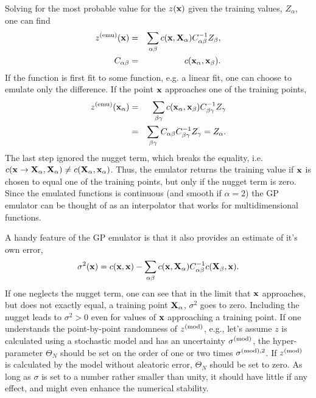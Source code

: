 Solving for the most probable value for the $z({\bf x})$ given the training values, $Z_\alpha$, one can find
\begin{eqnarray}
z^{\rm(emu)}({\bf x})&=&\sum_{\alpha\beta}c({\bf x},{\bf X}_\alpha) C^{-1}_{\alpha\beta}Z_\beta,\\
\nonumber
C_{\alpha\beta}&=&c({\bf x}_\alpha,{\bf x}_\beta).
\end{eqnarray}
If the function is first fit to some function, e.g. a linear fit, one can choose to emulate only the difference. If the point ${\bf x}$ approaches one of the training points,
\begin{eqnarray}
z^{\rm(emu)}({\bf x}_\alpha)&=&\sum_{\beta\gamma}c({\bf x}_\alpha,{\bf x}_\beta) C^{-1}_{\beta\gamma}Z_\gamma\\
\nonumber
&=&\sum_{\beta\gamma}C_{\alpha\beta}C^{-1}_{\beta\gamma}Z_\gamma=Z_\alpha.
\end{eqnarray}
The last step ignored the nugget term, which breaks the equality, i.e. $c({\bf x}\rightarrow {\bf X}_\alpha,{\bf X}_\alpha)\ne c({\bf X_{\alpha},{\bf x}_\alpha})$. Thus, the emulator returns the training value if ${\bf x}$ is chosen to equal one of the training points, but only if the nugget term is zero. Since the emulated functions is continuous (and smooth if $\alpha=2$) the GP emulator can be thought of as an interpolator that works for multidimensional functions.

A handy feature of the GP emulator is that it also provides an estimate of it's own error,
\begin{equation}
\sigma^2({\bf x}) = c({\bf x},{\bf x}) -\sum_{\alpha\beta}c({\bf x},{\bf X}_\alpha)C^{-1}_{\alpha\beta}
c({\bf X}_\beta,{\bf x}).
\end{equation}
If one neglects the nugget term, one can see that in the limit that ${\bf x}$ approaches, but does not exactly equal, a training point ${\bf X}_\alpha$, $\sigma^2$ goes to zero. Including the nugget leads to $\sigma^2>0$ even for values of ${\bf x}$ approaching a training point. If one understands the point-by-point randomness of $z^{\rm(mod)}$, e.g., let's assume $z$ is calculated using a stochastic model and has an uncertainty $\sigma^{\rm(mod)}$, the hyper-parameter $\Theta_N$ should be set on the order of one or two times $\sigma^{{\rm(mod)},2}$. If $z^{\rm(mod)}$ is calculated by the model without aleatoric error, $\Theta_N$ should be set to zero. As long as $\sigma$ is set to a number rather smaller than unity, it should have little if any effect, and might even enhance the numerical stability.


